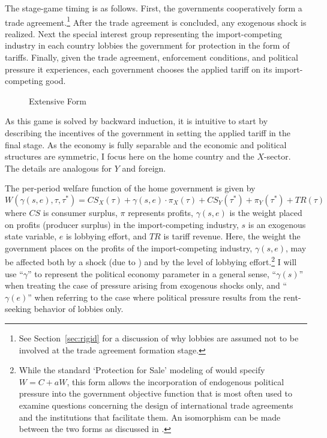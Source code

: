 \documentclass[12pt]{article}
\newcommand{\ga}{\gamma}
\begin{document}
The stage-game timing is as follows. First, the governments cooperatively form a trade agreement.\footnote{See Section~\ref{sec:rigid} for a discussion of why lobbies are assumed not to be involved at the trade agreement formation stage.} After the trade agreement is concluded, any exogenous shock is realized. Next the special interest group representing the import-competing industry in each country lobbies the government for protection in the form of tariffs. Finally, given the trade agreement, enforcement conditions, and political pressure it experiences, each government chooses the applied tariff on its import-competing good.

\begin{figure}
	\begin{center}
		
	\end{center}
	\caption{Extensive Form\label{fig:ext}}
\end{figure}


As this game is solved by backward induction, it is intuitive to start by describing the incentives of the government in setting the applied tariff in the final stage. As the economy is fully separable and the economic and political structures are symmetric, I focus here on the home country and the $X$-sector. The details are analogous for $Y$ and foreign.

The per-period welfare function of the home government is given by
\begin{equation}
  W(\ga(s,e),\tau,\tau^*) = \mathit{CS}_X(\tau) + \ga(s,e) \cdot \pi_X(\tau) + \mathit{CS}_Y(\tau^*) + \pi_Y(\tau^*) + \mathit{TR}(\tau)
  \label{eq:wel}
\end{equation}
where $\mathit{CS}$ is consumer surplus, $\pi$ represents profits, $\ga(s,e)$ is the weight placed on profits (producer surplus) in the import-competing industry, $s$ is an exogenous state variable, $e$ is lobbying effort, and $\mathit{TR}$ is tariff revenue. Here, the weight the government places on the profits of the import-competing industry, $\ga(s,e)$, may be affected both by a shock (due to \Textcite{ms2011}) and by the level of lobbying effort.\footnote{While the standard `Protection for Sale' modeling of \Textcite{gh94} would specify $W = C + aW$, this form allows the incorporation of endogenous political pressure into the government objective function that is most often used to examine questions concerning the design of international trade agreements and the institutions that facilitate them. An isomorphism can be made between the two forms as discussed in \Textcite{buzard2013b}.} I will use ``$\ga$'' to represent the political economy parameter in a general sense, ``$\ga(s)$'' when treating the case of pressure arising from exogenous shocks only, and ``$\ga(e)$'' when referring to the case where political pressure  results from the rent-seeking behavior of lobbies only.
\end{document}
